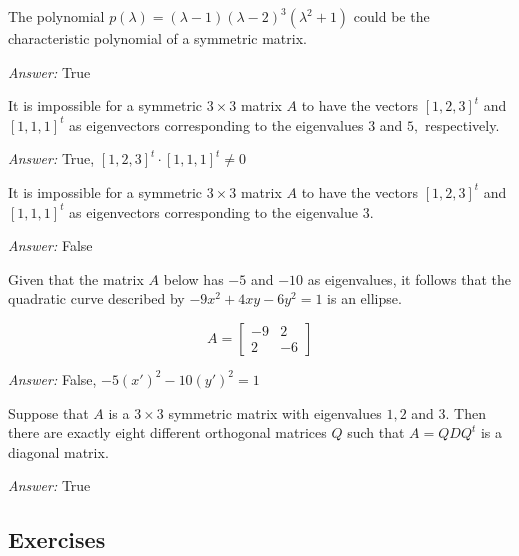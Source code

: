\documentclass[letterpaper]{article}
\newcommand{\ans}{\textit{Answer: }}
\newenvironment{question}[2][Question]{\begin{trivlist}
\item[\hskip \labelsep {\bfseries #1}\hskip \labelsep {\bfseries #2.}]}{\end{trivlist}}
\begin{document}
\begin{question}{6.26}
  The polynomial $p(\lambda)=(\lambda-1)(\lambda-2)^{3}\left(\lambda^{2}+1\right)$ 
  could be the characteristic polynomial of a symmetric matrix.

  \ans True
\end{question}

\begin{question}{6.27}
  It is impossible for a symmetric $3 \times 3$ matrix $A$ to have the vectors $[1,2,3]^{t}$ and
  $[1,1,1]^{t}$ as eigenvectors corresponding to the eigenvalues 3 and $5,$ respectively.

  \ans True, $[1,2,3]^t \cdot [1,1,1]^t \neq 0$
\end{question}

\begin{question}{6.28}
  It is impossible for a symmetric $3 \times 3$ matrix $A$ to have the vectors $[1,2,3]^{t}$ and
  $[1,1,1]^{t}$ as eigenvectors corresponding to the eigenvalue $3 .$

  \ans False
\end{question}

\begin{question}{6.29}
  Given that the matrix $A$ below has $-5$ and $-10$ as eigenvalues, it follows that
  the quadratic curve described by $-9 x^{2}+4 x y-6 y^{2}=1$ is an ellipse.

  $$
  A=\left[ \begin{array}{rr}{-9} & {2} \\ {2} & {-6}\end{array}\right]
  $$

  \ans False, $-5(x')^2 -10(y')^2 = 1$
\end{question}

\begin{question}{6.33}
  Suppose that $A$ is a $3 \times 3$ symmetric matrix with eigenvalues $1,2$ and $3 .$ Then
there are exactly eight different orthogonal matrices $Q$ such that $A=Q D Q^{t}$ is a
diagonal matrix.
  
  \ans True
\end{question}

\subsection{Exercises}
\end{document}
